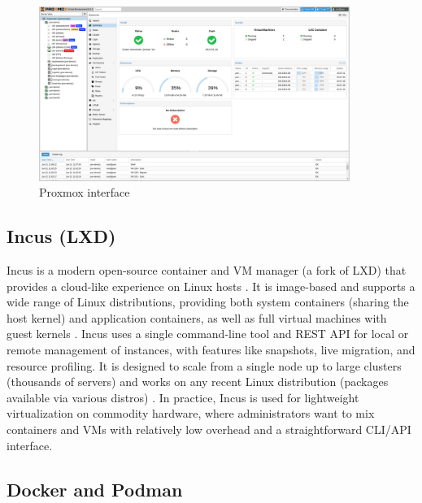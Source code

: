 \begin{figure}[H]
  \centering
  \includegraphics[width=0.9\textwidth]{imaxes/proxmox-ui.png}
  \caption{Proxmox interface}
  \label{fig:proxmox-ui}
\end{figure}

\subsection*{Incus (LXD)}

Incus is a modern open-source container and VM manager (a fork of LXD) that provides a cloud-like experience on Linux hosts \cite{IncusLinuxContainers2023}. It is image-based and supports a wide range of Linux distributions, providing both system containers (sharing the host kernel) and application containers, as well as full virtual machines with guest kernels \cite{IncusLinuxContainers2023}. Incus uses a single command-line tool and REST API for local or remote management of instances, with features like snapshots, live migration, and resource profiling. It is designed to scale from a single node up to large clusters (thousands of servers) \cite{IncusLinuxContainers2023} and works on any recent Linux distribution (packages available via various distros) \cite{IncusLinuxContainers2023}. In practice, Incus is used for lightweight virtualization on commodity hardware, where administrators want to mix containers and VMs with relatively low overhead and a straightforward CLI/API interface.

\subsection*{Docker and Podman}

